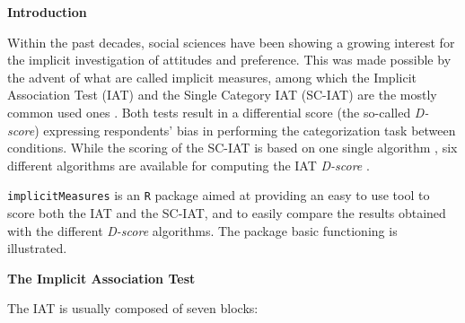 \documentclass[a0,landscape]{a0poster}
\begin{document}
\begin{multicols*}{3}

\begin{center}
	\huge \textbf{\textcolor{title}{Introduction}}
\end{center}

\vspace{5mm}
\large
Within the past decades, social sciences have been showing a growing interest for the implicit investigation of attitudes and preference. This was made possible by the advent of what are called implicit measures, among which the Implicit Association Test (IAT) \cite{Greenwald1998} and the Single Category IAT (SC-IAT) \cite{karpinski2006} are the mostly common used ones \cite{review}.
Both tests result in a differential score (the so-called \emph{D-score}) expressing respondents’ bias in performing the categorization task between conditions. While the scoring of the SC-IAT is based on one single algorithm \cite{karpinski2006}, six different algorithms are available for computing the IAT \emph{D-score} \cite{Greenwald2003}.


\texttt{implicitMeasures} is an \texttt{R} package aimed at providing an easy to use tool to score both the IAT and the SC-IAT, and to easily compare the results obtained with the different \emph{D-score} algorithms. The package basic functioning is illustrated. 


\begin{center}
	\Large \textbf{\textcolor{title}{The Implicit Association Test}}
\end{center}

The IAT is usually composed of seven blocks:


\end{multicols*}
\end{document}
